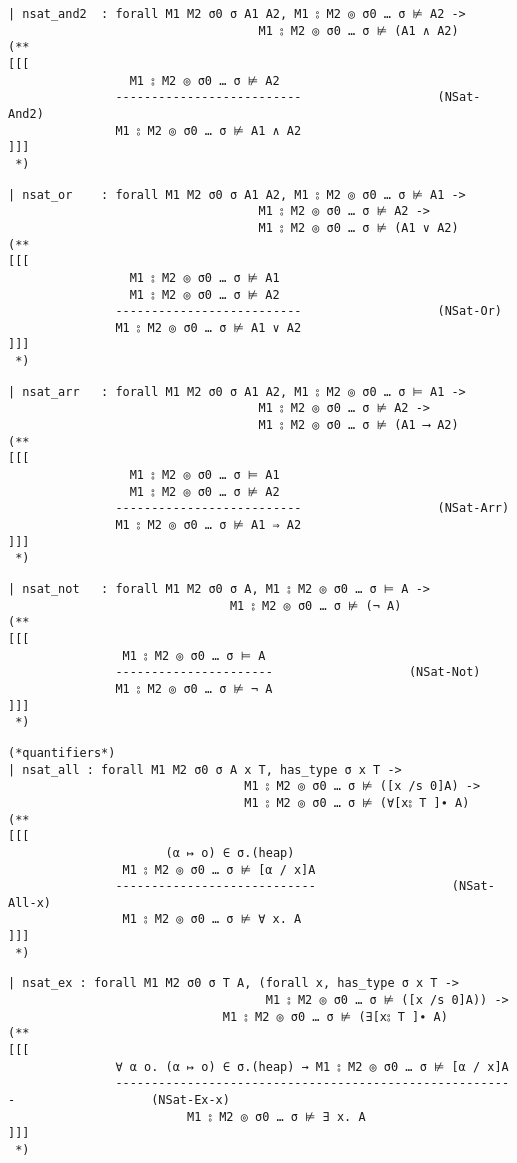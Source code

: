\documentclass[12pt]{article}
\begin{document}
\begin{verbatim}
| nsat_and2  : forall M1 M2 σ0 σ A1 A2, M1 ⦂ M2 ◎ σ0 … σ ⊭ A2 ->
                                   M1 ⦂ M2 ◎ σ0 … σ ⊭ (A1 ∧ A2)
(**
[[[
                 M1 ⦂ M2 ◎ σ0 … σ ⊭ A2
               --------------------------                   (NSat-And2)
               M1 ⦂ M2 ◎ σ0 … σ ⊭ A1 ∧ A2
]]]
 *)
\end{verbatim}
\begin{verbatim}
| nsat_or    : forall M1 M2 σ0 σ A1 A2, M1 ⦂ M2 ◎ σ0 … σ ⊭ A1 ->
                                   M1 ⦂ M2 ◎ σ0 … σ ⊭ A2 ->
                                   M1 ⦂ M2 ◎ σ0 … σ ⊭ (A1 ∨ A2)
(**
[[[
                 M1 ⦂ M2 ◎ σ0 … σ ⊭ A1
                 M1 ⦂ M2 ◎ σ0 … σ ⊭ A2
               --------------------------                   (NSat-Or)
               M1 ⦂ M2 ◎ σ0 … σ ⊭ A1 ∨ A2
]]]
 *)
\end{verbatim}
\begin{verbatim}
| nsat_arr   : forall M1 M2 σ0 σ A1 A2, M1 ⦂ M2 ◎ σ0 … σ ⊨ A1 ->
                                   M1 ⦂ M2 ◎ σ0 … σ ⊭ A2 ->
                                   M1 ⦂ M2 ◎ σ0 … σ ⊭ (A1 ⟶ A2)
(**
[[[
                 M1 ⦂ M2 ◎ σ0 … σ ⊨ A1
                 M1 ⦂ M2 ◎ σ0 … σ ⊭ A2
               --------------------------                   (NSat-Arr)
               M1 ⦂ M2 ◎ σ0 … σ ⊭ A1 ⇒ A2
]]]
 *)
\end{verbatim}
\begin{verbatim}
| nsat_not   : forall M1 M2 σ0 σ A, M1 ⦂ M2 ◎ σ0 … σ ⊨ A ->
                               M1 ⦂ M2 ◎ σ0 … σ ⊭ (¬ A)
(**
[[[
                M1 ⦂ M2 ◎ σ0 … σ ⊨ A
               ----------------------                   (NSat-Not)
               M1 ⦂ M2 ◎ σ0 … σ ⊭ ¬ A
]]]
 *)
\end{verbatim}
\begin{verbatim}
(*quantifiers*)
| nsat_all : forall M1 M2 σ0 σ A x T, has_type σ x T ->
                                 M1 ⦂ M2 ◎ σ0 … σ ⊭ ([x /s 0]A) ->
                                 M1 ⦂ M2 ◎ σ0 … σ ⊭ (∀[x⦂ T ]∙ A) 
(**
[[[
                      (α ↦ o) ∈ σ.(heap)
                M1 ⦂ M2 ◎ σ0 … σ ⊭ [α / x]A
               ----------------------------                   (NSat-All-x)
                M1 ⦂ M2 ◎ σ0 … σ ⊭ ∀ x. A
]]]
 *)
\end{verbatim}
\begin{verbatim}
| nsat_ex : forall M1 M2 σ0 σ T A, (forall x, has_type σ x T ->
                                    M1 ⦂ M2 ◎ σ0 … σ ⊭ ([x /s 0]A)) ->
                              M1 ⦂ M2 ◎ σ0 … σ ⊭ (∃[x⦂ T ]∙ A)
(**
[[[
               ∀ α o. (α ↦ o) ∈ σ.(heap) → M1 ⦂ M2 ◎ σ0 … σ ⊭ [α / x]A
               --------------------------------------------------------                   (NSat-Ex-x)
                         M1 ⦂ M2 ◎ σ0 … σ ⊭ ∃ x. A
]]]
 *)
\end{verbatim}
\end{document}
